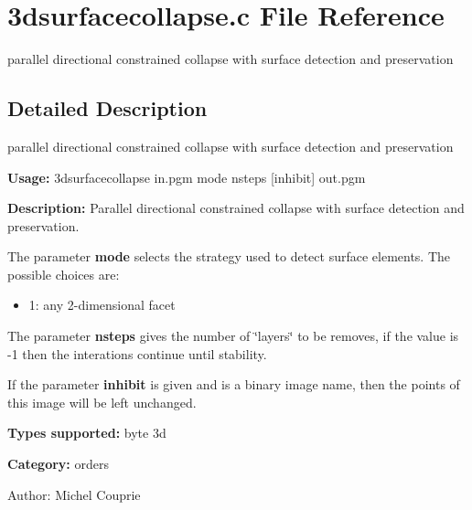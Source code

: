 \section{3dsurfacecollapse.c File Reference}
\label{3dsurfacecollapse_8c}
parallel directional constrained collapse with surface detection and preservation 



\subsection{Detailed Description}
parallel directional constrained collapse with surface detection and preservation 

{\bf Usage:} 3dsurfacecollapse in.pgm mode nsteps [inhibit] out.pgm

{\bf Description:} Parallel directional constrained collapse with surface detection and preservation.

The parameter {\bf mode} selects the strategy used to detect surface elements. The possible choices are: \begin{itemize}
\item 1: any 2-dimensional facet\end{itemize}
The parameter {\bf nsteps} gives the number of \char`\"{}layers\char`\"{} to be removes, if the value is -1 then the interations continue until stability.

If the parameter {\bf inhibit} is given and is a binary image name, then the points of this image will be left unchanged.

{\bf Types supported:} byte 3d

{\bf Category:} orders

\begin{Desc}
\item[Author:]Michel Couprie \end{Desc}
